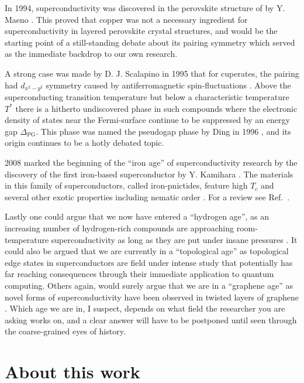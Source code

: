 In 1994, superconductivity was discovered in the perovskite structure of  by Y. Maeno \etal \cite{Maeno94}. This proved that copper
was not a necessary ingredient for superconductivity in layered perovskite crystal structures, and would be the starting point of a still-standing
debate about its pairing symmetry which served as the immediate backdrop to our own research.

A strong case was made by D. J. Scalapino in
1995 that for cuperates, the pairing had $d_{x^2-y^2}$ symmetry caused by antiferromagnetic spin-fluctuations \cite{Scalapino95}. Above the superconducting transition
temperature but below a characteristic temperature $T^\ast$ there is a hitherto undiscovered phase in such compounds where the electronic density of
states near the Fermi-surface continue to be suppressed by an energy gap $\Delta_\text{PG}$. This phase was named the pseudogap phase by Ding \etal
in 1996 \cite{Ding96}, and its origin continues to be a hotly debated topic.

2008 marked the beginning of the ``iron age'' of superconductivity research by the discovery of the first iron-based superconductor  by
Y. Kamihara \etal \cite{Kamihara08}. The materials in this family of superconductors, called iron-pnictides, feature high $T_c$ and several other exotic
properties including nematic order \cite{Fernandes14}. For a review see Ref.~\cite{Paglione10}.

Lastly one could argue that we now have entered a ``hydrogen age'', as an increasing number of hydrogen-rich compounds are approaching room-temperature
superconductivity as long as they are put under insane pressures \cite{Semenok20, Snider20}. It could also be argued that we are currently in a
``topological age'' as topological edge states in superconductors are field under intense study \cite{Wang20} that potentially has far reaching
consequences through their immediate application to quantum computing. Others again, would surely argue that we are in a ``graphene age'' as 
novel forms of superconductivity have been observed in twisted layers of graphene \cite{Park21}.
Which age we are in, I suspect, depends on what field the researcher
you are asking works on, and a clear answer will have to be postponed until seen through the coarse-grained eyes of history.


\section{About this work}

